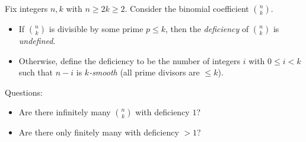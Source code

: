 Fix integers $n,k$ with $n\ge 2k\ge 2$.
Consider the binomial coefficient $\binom{n}{k}$.

\begin{itemize}
\item If $\binom{n}{k}$ is divisible by some prime $p\le k$, then the \emph{deficiency} of $\binom{n}{k}$ is \emph{undefined}.
\item Otherwise, define the deficiency to be the number of integers $i$ with $0\le i<k$ such that $n-i$ is \emph{$k$-smooth} (all prime divisors are $\le k$).
\end{itemize}

Questions:
\begin{itemize}
\item Are there infinitely many $\binom{n}{k}$ with deficiency $1$?
\item Are there only finitely many with deficiency $>1$?
\end{itemize}
